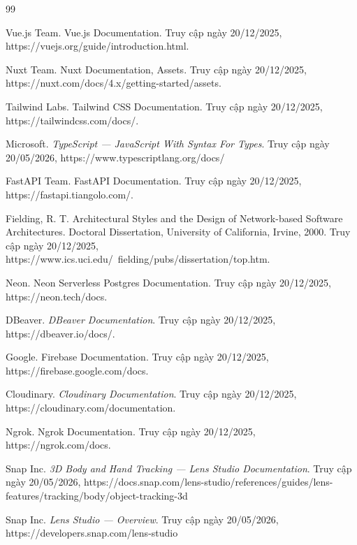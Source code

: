 \documentclass[a4paper,13pt]{report}
\begin{document}
\clearpage
{}
\begin{thebibliography}{99}

Vue.js Team. Vue.js Documentation. Truy cập ngày 20/12/2025,
https://vuejs.org/guide/introduction.html.

Nuxt Team. Nuxt Documentation, Assets. Truy cập ngày 20/12/2025,
https://nuxt.com/docs/4.x/getting-started/assets.

Tailwind Labs. Tailwind CSS Documentation. Truy cập ngày 20/12/2025,
https://tailwindcss.com/docs/.

Microsoft. \textit{TypeScript --- JavaScript With Syntax For Types}.
Truy cập ngày 20/05/2026,
https://www.typescriptlang.org/docs/

FastAPI Team. FastAPI Documentation. Truy cập ngày 20/12/2025,
https://fastapi.tiangolo.com/.

Fielding, R. T. Architectural Styles and the Design of Network-based
Software Architectures. Doctoral Dissertation, University of California,
Irvine, 2000. Truy cập ngày 20/12/2025,
https://www.ics.uci.edu/~fielding/pubs/dissertation/top.htm.

Neon. Neon Serverless Postgres Documentation. Truy cập ngày 20/12/2025,
https://neon.tech/docs.

DBeaver. \textit{DBeaver Documentation}. Truy cập ngày 20/12/2025,
https://dbeaver.io/docs/.

Google. Firebase Documentation. Truy cập ngày 20/12/2025,
https://firebase.google.com/docs.

Cloudinary. \textit{Cloudinary Documentation}. Truy cập ngày 20/12/2025,
https://cloudinary.com/documentation.

Ngrok. Ngrok Documentation. Truy cập ngày 20/12/2025,
https://ngrok.com/docs.

Snap Inc. \textit{3D Body and Hand Tracking --- Lens Studio Documentation}.
Truy cập ngày 20/05/2026,
https://docs.snap.com/lens-studio/references/guides/lens-features/tracking/body/object-tracking-3d

Snap Inc. \textit{Lens Studio --- Overview}.
Truy cập ngày 20/05/2026,
https://developers.snap.com/lens-studio


\end{thebibliography}
\end{document}
